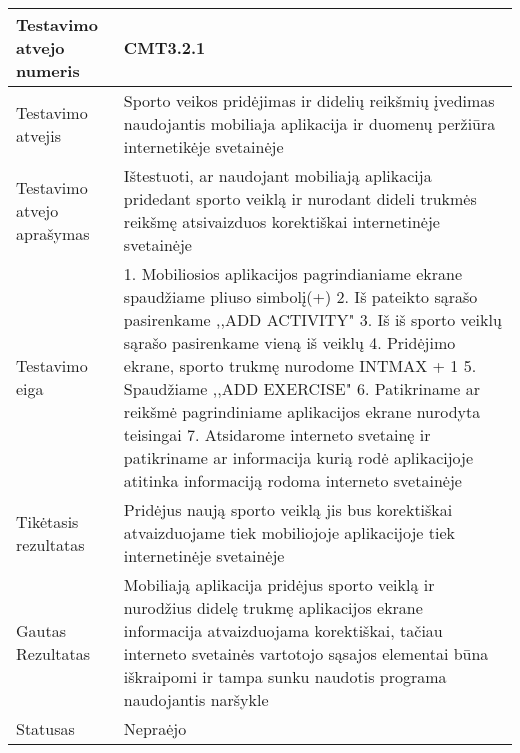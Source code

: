 \documentclass[oneside]{VUMIFPSkursinis}
\begin{document}
\begin{center}
    \begin{tabular}{ |p{5cm}|p{13cm}|}
    \hline
    	Testavimo atvejo numeris & CMT3.2.1\\ \hline
    	Testavimo atvejis & Sporto veikos pridėjimas  ir didelių reikšmių įvedimas naudojantis mobiliaja aplikacija ir duomenų peržiūra internetikėje svetainėje \\ \hline
	Testavimo atvejo aprašymas &Ištestuoti, ar naudojant mobiliają aplikacija pridedant sporto veiklą ir nurodant dideli trukmės reikšmę atsivaizduos korektiškai internetinėje svetainėje   \\ \hline
	Testavimo eiga & 1. Mobiliosios aplikacijos pagrindianiame ekrane spaudžiame pliuso simbolį(+)
				2. Iš pateikto sąrašo pasirenkame ,,ADD ACTIVITY"
				3. Iš iš sporto veiklų sąrašo pasirenkame vieną iš veiklų
				4. Pridėjimo ekrane, sporto trukmę nurodome INTMAX + 1
				5. Spaudžiame ,,ADD EXERCISE"
				6. Patikriname ar reikšmė pagrindiniame aplikacijos ekrane nurodyta teisingai
				7. Atsidarome interneto svetainę ir patikriname ar informacija kurią rodė aplikacijoje atitinka informaciją rodoma interneto svetainėje \\ \hline
	Tikėtasis rezultatas &  Pridėjus naują sporto veiklą jis bus korektiškai atvaizduojame tiek mobiliojoje aplikacijoje tiek internetinėje svetainėje\\ \hline
	Gautas Rezultatas & Mobiliają aplikacija pridėjus sporto veiklą ir nurodžius didelę trukmę aplikacijos ekrane informacija atvaizduojama korektiškai, tačiau interneto svetainės vartotojo sąsajos elementai būna iškraipomi ir tampa sunku naudotis programa naudojantis naršykle  \\ \hline
	Statusas &  Nepraėjo\\ \hline
    \hline
    \end{tabular}
\end{center}
\end{document}
